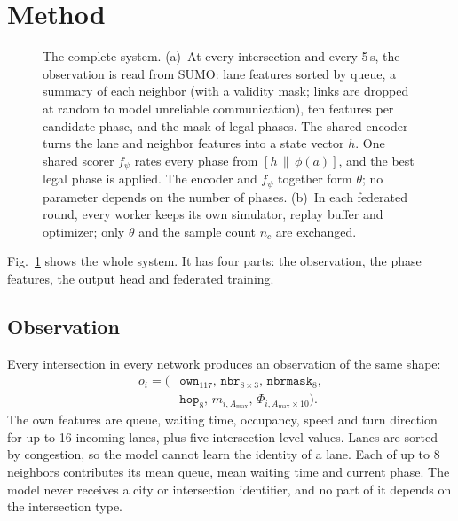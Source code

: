 \documentclass[conference]{IEEEtran}
\begin{document}
\section{Method}\label{sec:method}

\begin{figure}[t]
\centering

\caption{The complete system. (a)~At every intersection and every 5\,s, the
observation is read from SUMO: lane features sorted by queue, a summary of each neighbor
(with a validity mask; links are dropped at random to model unreliable communication),
ten features per candidate phase, and the mask of legal phases. The shared encoder turns
the lane and neighbor features into a state vector $h$. One shared scorer $f_\psi$ rates
every phase from $[h\,\|\,\phi(a)]$, and the best legal phase is applied. The encoder and
$f_\psi$ together form $\theta$; no parameter depends on the number of phases. (b)~In each
federated round, every worker keeps its own simulator, replay buffer and optimizer; only
$\theta$ and the sample count $n_c$ are exchanged.}
\label{fig:arch}
\end{figure}

Fig.~\ref{fig:arch} shows the whole system. It has four parts: the observation, the phase
features, the output head and federated training.

\subsection{Observation}
Every intersection in every network produces an observation of the same shape:
\begin{equation*}
\begin{aligned}
o_i=\big(&\texttt{own}_{117},\,\texttt{nbr}_{8\times3},\,\texttt{nbrmask}_{8},\\
&\texttt{hop}_{8},\,m_{i,A_{\max}},\,\Phi_{i,A_{\max}\times10}\big).
\end{aligned}
\end{equation*}
The own features are queue, waiting time, occupancy, speed and turn direction for up to
16 incoming lanes, plus five intersection-level values. Lanes are sorted by congestion, so
the model cannot learn the identity of a lane. Each of up to 8 neighbors contributes its
mean queue, mean waiting time and current phase. The model never receives a city or
intersection identifier, and no part of it depends on the intersection type.
\end{document}
